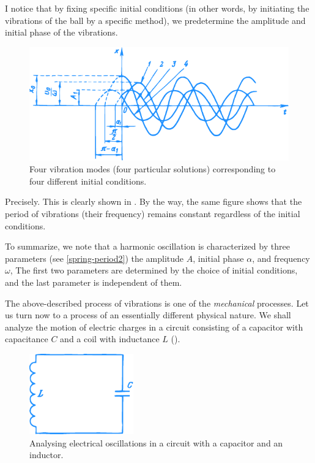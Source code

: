 \rdr I notice that by fixing specific initial conditions (in other words, by initiating the vibrations of the ball by a specific method), we predetermine the amplitude and initial phase of the vibrations.


\begin{figure}[!ht]%
\centering
\includegraphics[width=\textwidth]{figures/fig-59.pdf} 
\caption{Four vibration modes (four particular solutions) corresponding to four different initial conditions.}
\label{fig-59}
\end{figure}

\athr Precisely. This is clearly shown in . By the way, the same figure shows that the period of vibrations (their frequency) remains constant regardless of the initial conditions.

To summarize, we note that a harmonic oscillation is characterized by three parameters (see \eqref{spring-period2}) the amplitude $A$, initial phase $\alpha$, and frequency $\omega$, The first two parameters are determined by the choice of initial conditions, and the last parameter is independent of them.

The above-described process of vibrations is one of the \emph{mechanical} processes. Let us turn now to a process of an essentially different physical nature. We shall analyze the motion of electric charges in a circuit consisting of a capacitor with capacitance $C$ and a coil with inductance $L$ ().

\begin{figure}[!ht]%
\centering
\includegraphics[width=0.4\textwidth]{figures/fig-60.pdf} 
\caption{Analysing electrical oscillations in a circuit with a capacitor and an inductor.}
\label{fig-60}
\end{figure}

